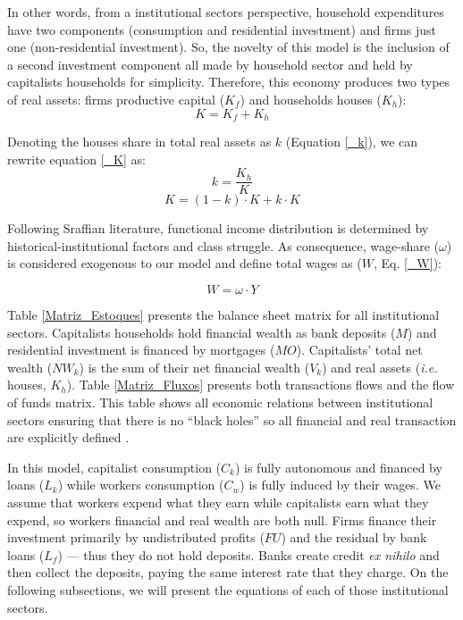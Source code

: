\documentclass[12pt, a4]{article}
\begin{document}
In other words, from a institutional sectors perspective, household expenditures have two components (consumption and residential investment) and firms just one (non-residential investment).
So, the novelty of this model is the inclusion of a second investment component all made by household sector and held by capitalists households for simplicity. 
Therefore, this economy produces two types of real assets: firms productive capital (\(K_f\)) and households houses (\(K_h\)):
\begin{equation}
    \label{_K}
    K = K_f + K_h
\end{equation}

Denoting the houses share in total real assets as \(k\) (Equation \ref{_k}), we can rewrite equation \ref{_K} as:
\begin{equation}
\label{_k}
    k = \frac{K_h}{K}
\end{equation}
$$
K = (1-k)\cdot K + k\cdot K
$$

Following Sraffian literature, functional income distribution is determined by historical-institutional factors and class struggle.
As consequence, wage-share (\(\omega\)) is considered exogenous to our model and define total wages as (\(W\), Eq. \ref{_W}):

\begin{equation}
\label{_W}
    W = \omega\cdot Y
\end{equation}

Table \ref{Matriz_Estoques} presents the balance sheet matrix for all institutional sectors. 
Capitalists households hold financial wealth as bank deposits (\(M\)) and residential investment is financed by mortgages (\(MO\)).
Capitalists' total net wealth (\(NW_{k}\)) is the sum of their net financial wealth (\(V_{k}\)) and real assets (\textit{i.e.} houses, \(K_h\)).
Table  \ref{Matriz_Fluxos} presents both transactions flows and the flow of funds matrix. 
This table shows all economic relations between institutional sectors ensuring that there is no  ``black holes''
so all financial and real transaction are explicitly defined \cite{godley_monetary_2007,macedo_e_silva_peering_2011}.

In this model, capitalist consumption (\(C_k\)) is fully autonomous and financed by loans (\(L_{k}\)) while workers consumption (\(C_w\)) is fully induced by their wages.
We assume that workers expend what they earn while capitalists earn what they expend, so workers financial and real wealth are both null.
Firms finance their investment primarily by undistributed profits (\(FU\)) and the residual by bank loans (\(L_f\)) --- thus they do not hold deposits. 
Banks create credit \textit{ex nihilo} and then collect the deposits, paying the same interest rate that they charge.
On the following subsections, we will present the equations of each of those institutional sectors.
\end{document}
